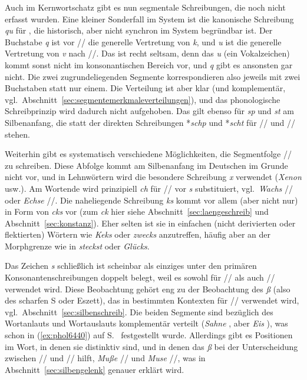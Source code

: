Auch im Kernwortschatz gibt es nun segmentale Schreibungen, die noch nicht erfasst wurden.
Eine kleiner Sonderfall im System ist die kanonische Schreibung \textit{qu} für \textipa{[kv]}, die historisch, aber nicht synchron im System begründbar ist.
Der Buchstabe \textit{q} ist vor // die generelle Vertretung von \textit{k}, und \textit{u} ist die generelle Vertretung von \textit{v} nach //.
Das ist recht seltsam, denn das \textit{u} (ein Vokalzeichen) kommt sonst nicht im konsonantischen Bereich vor, und \textit{q} gibt es ansonsten gar nicht.
Die zwei zugrundeliegenden Segmente korrespondieren also jeweils mit zwei Buchstaben statt nur einem.
Die Verteilung ist aber klar (und komplementär, vgl.\ Abschnitt~\ref{sec:segmentemerkmaleverteilungen}), und das phonologische Schreibprinzip wird dadurch nicht aufgehoben.
Das gilt ebenso für \textit{sp} und \textit{st} am Silbenanfang, die statt der direkten Schreibungen *\textit{schp} und *\textit{scht} für // und // stehen.

Weiterhin gibt es systematisch verschiedene Möglichkeiten, die Segmentfolge // zu schreiben.
Diese Abfolge kommt am Silbenanfang im Deutschen im Grunde nicht vor, und in Lehnwörtern wird die besondere Schreibung \textit{x} verwendet (\textit{Xenon} usw.).
Am Wortende wird prinzipiell \textit{ch} für // vor \textit{s} substituiert, vgl.\ \textit{Wachs} // oder \textit{Echse} //.
Die naheliegende Schreibung \textit{ks} kommt vor allem (aber nicht nur) in Form von \textit{cks} vor (zum \textit{ck} hier siehe Abschnitt~\ref{sec:laengeschreib} und Abschnitt~\ref{sec:konstanz}).
Eher selten ist sie in einfachen (nicht derivierten oder flektierten) Wörtern wie \textit{Keks} oder \textit{zwecks} anzutreffen, häufig aber an der Morphgrenze wie in \textit{steckst} oder \textit{Glücks}.

Das Zeichen \textit{s} schließlich ist scheinbar als einziges unter den primären Konsonantenschreibungen doppelt belegt, weil es sowohl für // als auch // verwendet wird.
Diese Beobachtung gehört eng zu der Beobachtung des \textit{ß} (also des scharfen S oder Eszett), das in bestimmten Kontexten für // verwendet wird, vgl.\ Abschnitt~\ref{sec:silbenschreib}.
Die beiden Segmente sind bezüglich des Wortanlauts und Wortauslauts komplementär verteilt (\textit{Sahne} \textipa{[za:n@]}, aber \textit{Eis} \textipa{[P\t{aE}s]}), was schon in (\ref{ex:phol6440}) auf S.~\pageref{ex:phol6440} festgestellt wurde.
Allerdings gibt es Positionen im Wort, in denen sie distinktiv sind, und in denen das \textit{ß} bei der Unterscheidung zwischen // und // hilft, \zB \textit{Muße} // und \textit{Muse} //, was in Abschnitt~\ref{sec:silbengelenk} genauer erklärt wird.

